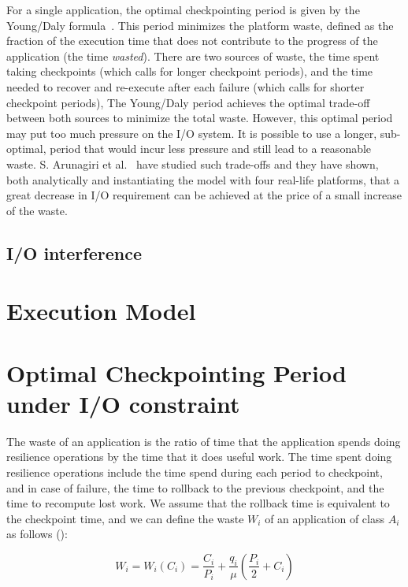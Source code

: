 \documentclass[conference]{IEEEtran}
\newcommand{\app}[1]{A_{#1}}
\newcommand{\nbnodes}[1]{q_{#1}}
\newcommand{\period}[1]{P_{#1}}
\newcommand{\ckpt}[1]{C_{#1}}
\newcommand{\wasteapp}[1]{W_{#1}}
\newcommand{\mtbfplat}{\mu}
\newcommand{\wastefct}[2]{W_{#1}(#2)}
\begin{document}
For a single application, the optimal checkpointing period is given by the Young/Daly
formula~\cite{young74,daly04}. This period minimizes the platform waste, defined as
the fraction of the
execution time that does not contribute to the progress of the application (the
time \emph{wasted}).  There are two sources of waste, the time spent taking checkpoints
(which calls for longer checkpoint periods),
and the time needed to recover and re-execute after each failure
(which calls for shorter checkpoint periods),
The Young/Daly
period achieves the optimal trade-off between both sources to minimize the
total waste.
However, this optimal period may put too much pressure
on the I/O system. It is possible to use a longer, sub-optimal, period that would incur
less pressure and still lead to a reasonable waste. S. Arunagiri et al.~\cite{Arunagiri2009} have studied such trade-offs and they have shown, both analytically and instantiating the model with four real-life platforms,
that a great decrease in I/O requirement can be achieved  at the price of a small increase of the waste.

\subsection{I/O interference}


\section{Execution Model}
\label{sec.model}


\section{Optimal Checkpointing Period under I/O constraint}
\label{sec.optimal}

The waste of an application is the ratio of time that the application spends doing
resilience operations by the time that it does useful work. The time
spent doing resilience operations include the time spend during each period to checkpoint, and in case of failure, the time to rollback to the previous checkpoint, and the time to recompute lost work. We assume
that the rollback time is equivalent to the checkpoint time, and we
can define the waste $\wasteapp{i}$ of an application of class
$\app{i}$ as follows (\cite{springer-monograph}):

\begin{equation}
\wasteapp{i} = \wastefct{i}{\ckpt{i}} = \frac{\ckpt{i}}{\period{i}} +
\frac{\nbnodes{i}}{\mtbfplat}(\frac{\period{i}}{2} + \ckpt{i})
\label{eq.wasteAi}
\end{equation}
\end{document}
